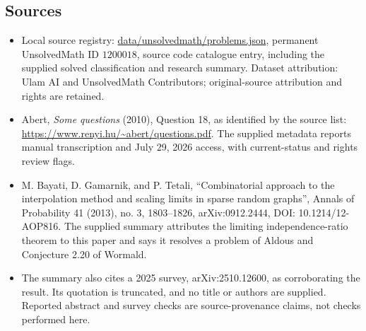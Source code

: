 \documentclass[11pt]{article}
\begin{document}
\subsection{Sources}
\begin{itemize}
\item Local source registry: \url{data/unsolvedmath/problems.json}, permanent UnsolvedMath ID $1200018$, source code catalogue entry, including the supplied solved classification and research summary. Dataset attribution: Ulam AI and UnsolvedMath Contributors; original-source attribution and rights are retained.
\item Abert, \emph{Some questions} (2010), Question 18, as identified by the source list: \url{https://www.renyi.hu/~abert/questions.pdf}. The supplied metadata reports manual transcription and July 29, 2026 access, with current-status and rights review flags.
\item M. Bayati, D. Gamarnik, and P. Tetali, ``Combinatorial approach to the interpolation method and scaling limits in sparse random graphs'', Annals of Probability 41 (2013), no. 3, 1803--1826, arXiv:0912.2444, DOI: 10.1214/12-AOP816. The supplied summary attributes the limiting independence-ratio theorem to this paper and says it resolves a problem of Aldous and Conjecture 2.20 of Wormald.
\item The summary also cites a 2025 survey, arXiv:2510.12600, as corroborating the result. Its quotation is truncated, and no title or authors are supplied. Reported abstract and survey checks are source-provenance claims, not checks performed here.
\end{itemize}
\end{document}
